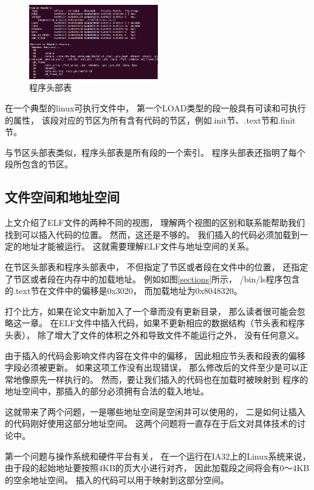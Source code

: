 \begin{figure}[h!]
  \centering
  \includegraphics[width=0.5\textwidth]{figure/programs.png}
  \caption{程序头部表}
  \label{programs}
\end{figure}
在一个典型的linux可执行文件中，
第一个LOAD类型的段一般具有可读和可执行的属性，
该段对应的节区为所有含有代码的节区，例如.init节、.text节和.finit节。

与节区头部表类似，程序头部表是所有段的一个索引。
程序头部表还指明了每个段所包含的节区。


\subsection{文件空间和地址空间}

上文介绍了ELF文件的两种不同的视图，
理解两个视图的区别和联系能帮助我们找到可以插入代码的位置。
然而，这还是不够的。
我们插入的代码必须加载到一定的地址才能被运行。
这就需要理解ELF文件与地址空间的关系。

在节区头部表和程序头部表中，
不但指定了节区或者段在文件中的位置，
还指定了节区或者段在内存中的加载地址。
例如如图\ref{sections}所示，
/bin/ls程序包含的.text节在文件中的偏移是0x3020，
而加载地址为0x8048320。

打个比方，如果在论文中新加入了一个章而没有更新目录，
那么读者很可能会忽略这一章。
在ELF文件中插入代码，如果不更新相应的数据结构（节头表和程序头表），
除了增大了文件的体积之外和导致文件不能运行之外，
没有任何意义。

由于插入的代码会影响文件内容在文件中的偏移，
因此相应节头表和段表的偏移字段必须被更新。
如果这项工作没有出现错误，
那么修改后的文件至少是可以正常地像原先一样执行的。
然而，要让我们插入的代码也在加载时被映射到
程序的地址空间中，那插入的部分必须拥有合法的载入地址。

这就带来了两个问题，一是哪些地址空间是空闲并可以使用的，
二是如何让插入的代码刚好使用这部分地址空间。
这两个问题将一直存在于后文对具体技术的讨论中。

第一个问题与操作系统和硬件平台有关，
在一个运行在IA32上的Linux系统来说，
由于段的起始地址要按照4KB的页大小进行对齐，
因此加载段之间将会有0～4KB的空余地址空间。
插入的代码可以用于映射到这部分空间。

